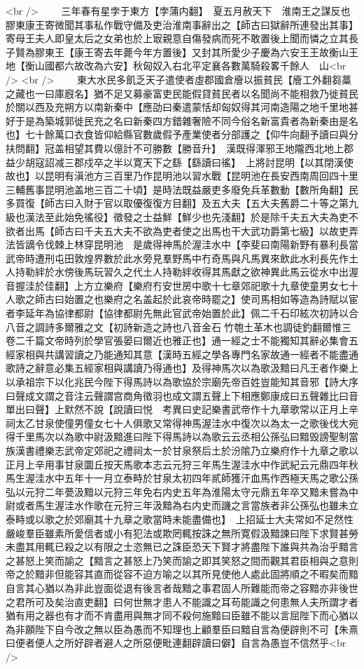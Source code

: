 <br />
　　三年春有星孛于東方【孛蒲内翻】　夏五月赦天下　淮南王之謀反也膠東康王寄微聞其事私作戰守備及吏治淮南事辭出之【師古曰獄辭所連發出其事】寄母王夫人即皇太后之女弟也於上㝡親意自傷發病而死不敢置後上聞而憐之立其長子賢為膠東王【康王寄去年薨今年方置後】又封其所愛少子慶為六安王王故衡山王地【衡山國都六故改為六安】秋匈奴入右北平定襄各數萬騎殺畧千餘人　山<br />
<br />
　　東大水民多飢乏天子遣使者虛郡國倉廥以振貧民【廥工外翻芻藁之藏也一曰庫廐名】猶不足又募豪富吏民能假貸貧民者以名聞尚不能相救乃徙貧民於關以西及充朔方以南新秦中【應劭曰秦遣蒙恬却匈奴得其河南造陽之地千里地甚好于是為築城郭徙民充之名曰新秦四方錯雜奢險不同今俗名新富貴者為新秦由是名也】七十餘萬口衣食皆仰給縣官數歲假予產業使者分部護之【仰牛向翻予讀曰與分扶問翻】冠盖相望其費以億計不可勝數【勝音升】　漢既得渾邪王地隴西北地上郡益少胡寇詔减三郡戍卒之半以寛天下之繇【繇讀曰徭】　上將討昆明【以其閉漢使故也】以昆明有滇池方三百里乃作昆明池以習水戰【昆明池在長安西南周回四十里三輔舊事昆明池盖地三百二十頃】是時法既益嚴吏多廢免兵革數動【數所角翻】民多買復【師古曰入財于官以取優復復方目翻】及五大夫【五大夫舊爵二十等之第九級也漢法至此始免徭役】徵發之士益鮮【鮮少也先淺翻】於是除千夫五大夫為吏不欲者出馬【師古曰千夫五大夫不欲為吏者使之出馬也干大武功爵第七級】以故吏弄法皆謫令伐棘上林穿昆明池　是歲得神馬於渥洼水中【李斐曰南陽新野有暴利長當武帝時遭刑屯田敦煌界數於此水旁見羣野馬中冇奇馬與凡馬異來飲此水利長先作土人持勒絆於水傍後馬玩習久之代土人持勒絆收得其馬獻之欲神異此馬云從水中出渥音握洼於佳翻】上方立樂府【樂府冇安世房中歌十七章郊祀歌十九章使童男女七十人歌之師古曰始置之也樂府之名盖起於此哀帝時罷之】使司馬相如等造為詩賦以宦者李延年為協律都尉【協律都尉先無此官武帝始置於此】佩二千石印絃次初詩以合八音之調詩多爾雅之文【初詩新造之詩也八音金石竹匏土革木也調徒釣翻爾惟三卷二千篇文帝時列於學官張晏曰爾近也雅正也】通一經之士不能獨知其辭必集會五經家相與共講習讀之乃能通知其意【漢時五經之學各專門名家故通一經者不能盡通歌詩之辭意必集五經家相與講讀乃得通也】及得神馬次以為歌汲黯曰凡王者作樂上以承祖宗下以化兆民今陛下得馬詩以為歌協於宗廟先帝百姓豈能知其音邪【詩大序曰聲成文謂之音注云聲謂宫商角徵羽也成文謂五聲上下相應鄭康成曰五聲雜比曰音單出曰聲】上默然不說【說讀曰悦　考異曰史記樂書武帝作十九章歌常以正月上辛祠太乙甘泉使僮男僮女七十人俱歌又常得神馬渥洼水中復次以為太一之歌後伐大宛得千里馬次以為歌中尉汲黯進曰陛下得馬詩以為歌云云丞相公孫弘曰黯毁謗聖制當族漢書禮樂志武帝定郊祀之禮祠太一於甘泉祭后土於汾隂乃立樂府作十九章之歌以正月上辛用事甘泉圜丘按天馬歌本志云元狩三年馬生渥洼水中作武紀云元鼎四年秋馬生渥洼水中五年十一月立泰畤於甘泉太初四年貳師獲汗血馬作西極天馬之歌公孫弘以元狩二年甍汲黯以元狩三年免右内史五年為淮陽太守元鼎五年卒又黯未嘗為中尉或者馬生渥洼水作歌在元狩三年汲黯為右内史而譏之言當族者非公孫弘也雖未立泰畤或以歌之於郊廟其十九章之歌當時未能盡備也】　上招延士大夫常如不足然性嚴峻羣臣雖素所愛信者或小有犯法或欺罔輒按誅之無所寛假汲黯諫曰陛下求賢甚勞未盡其用輒已殺之以有限之士恣無已之誅臣恐天下賢才將盡陛下誰與共為治乎黯言之甚怒上笑而諭之【黯言之甚怒上乃笑而諭之即其笑怒之間而觀其君臣相與之意則帝之於黯非但能容其直而從容不迫方喻之以其所見使他人處此固將順之不暇矣而黯自言其心猶以為非此豈面從退有後言者哉黯之事君固人所難能而帝之容黯亦非後世之君所可及矣治直吏翻】曰何世無才患人不能識之耳苟能識之何患無人夫所謂才者猶有用之器也有才而不肯盡用與無才同不殺何施黯曰臣雖不能以言屈陛下而心猶以為非願陛下自今改之無以臣為愚而不知理也上顧羣臣曰黯自言為便辟則不可【朱熹曰便者便人之所好辟者避人之所惡便毗連翻辟讀曰僻】自言為愚豈不信然乎<br />
